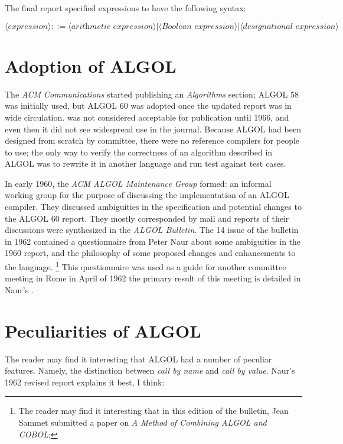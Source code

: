 The final report specified expressions to have the following syntax:

\[
\langle \textit{expression} \rangle ::=
\langle \textit{arithmetic expression} \rangle
| \langle \textit{Boolean expression} \rangle
| \langle \textit{designational expression} \rangle
\]

\section{Adoption of ALGOL}

The \textit{ACM Communications} started publishing an \textit{Algorithms} section;
ALGOL 58 was initially used, but ALGOL 60 was adopted once the updated report
was in wide circulation.
\FTN was not considered acceptable for publication until 1966, and even then
it did not see widespread use in the journal.
Because ALGOL had been designed from scratch by committee, there were
no reference compilers for people to use; the only way to verify the correctness
of an algorithm described in ALGOL was to rewrite it in another language
and run test against test cases.

In early 1960, the \textit{ACM ALGOL Maintenance Group} formed: an informal working
group for the purpose of discussing the implementation of an ALGOL compiler.
They discussed ambiguities in the specification and potential changes to the ALGOL 60 report.
They mostly corresponded by mail and reports of their discussions were synthesized in
the \textit{ALGOL Bulletin}\cite{sammet_programming_languages_history_and_fundamentals_1969}.
The 14 issue of the bulletin in 1962 contained a questionnaire from Peter Naur
about some ambiguities in the 1960 report, and the philosophy of some proposed changes and
enhancements to the language.
\footnote{The reader may find it interesting that in this edition of the bulletin,
Jean Sammet submitted a paper on \textit{A Method of Combining ALGOL and COBOL};
}
This questionnaire was used as a guide for another committee meeting in Rome in April of 1962
the primary result of this meeting is detailed in Naur's
.

\section{Peculiarities of ALGOL}

The reader may find it interesting that ALGOL had a number of peculiar features.
Namely, the distinction between \textit{call by name} and \textit{call by value}.
Naur's 1962 revised report explains it best, I think\cite[Section 4.7.3]{naur_revised_report_algol_1962}:

